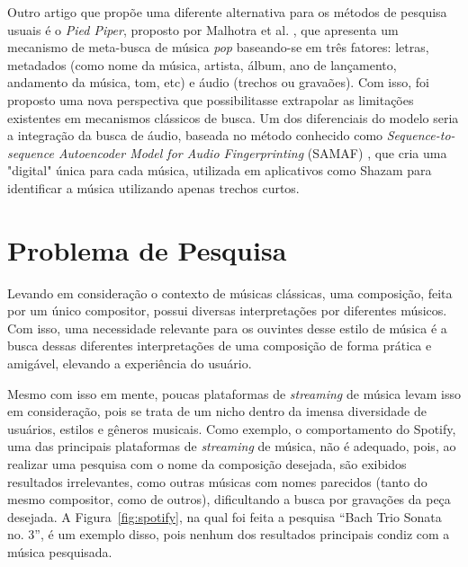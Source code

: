 \documentclass[12pt]{article}
\begin{document}
Outro artigo que propõe uma diferente alternativa para os métodos de pesquisa
usuais é o \emph{Pied Piper}, proposto por Malhotra et al. \cite{malhotra:22},
que apresenta um mecanismo de meta-busca de música \emph{pop} baseando-se em
três fatores: letras, metadados (como nome da música, artista, álbum, ano de
lançamento, andamento da música, tom, etc) e áudio (trechos ou gravaões). Com
isso, foi proposto uma nova perspectiva que possibilitasse extrapolar as
limitações existentes em mecanismos clássicos de busca. Um dos diferenciais do
modelo seria a integração da busca de áudio, baseada no método conhecido como
\emph{Sequence-to-sequence Autoencoder Model for Audio Fingerprinting} (SAMAF)
\cite{10.1145/3380828}, que cria uma "digital" única para cada música, utilizada
em aplicativos como Shazam para identificar a música utilizando apenas trechos
curtos.

\section{Problema de Pesquisa} \label{sec:problem}

Levando em consideração o contexto de músicas clássicas, uma composição, feita
por um único compositor, possui diversas interpretações por diferentes músicos.
Com isso, uma necessidade relevante para os ouvintes desse estilo de música é a
busca dessas diferentes interpretações de uma composição de forma prática e
amigável, elevando a experiência do usuário.

Mesmo com isso em mente, poucas plataformas de \emph{streaming} de música levam
isso em consideração, pois se trata de um nicho dentro da imensa diversidade de
usuários, estilos e gêneros musicais. Como exemplo, o comportamento do Spotify,
uma das principais plataformas de \emph{streaming} de música, não é adequado,
pois, ao realizar uma pesquisa com o nome da composição desejada, são exibidos
resultados irrelevantes, como outras músicas com nomes parecidos (tanto do mesmo
compositor, como de outros), dificultando a busca por gravações da peça
desejada. A Figura~\ref{fig:spotify}, na qual foi feita a pesquisa ``Bach Trio
Sonata no. 3'', é um exemplo disso, pois nenhum dos resultados principais condiz
com a música pesquisada.
\end{document}
